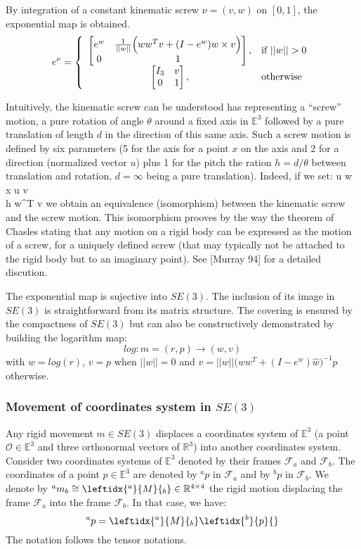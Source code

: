 \documentclass{book}
\begin{document}
By integration of a constant kinematic screw $\nu = (v,w)$ on $[0,1]$, the exponential map is obtained.
\[ e^{\nu} =
\left\{ \begin{array}{cl}
 \BIN e^{w} &  \frac{1}{||w||}\Big( ww^Tv + (I-e^{w}) w \times v \Big) \\ 0 & 1 \BOUT,& \textrm{if } ||w||>0 \\
 \BIN I_3 &  v \\ 0 & 1 \BOUT,& \textrm{otherwise}
\end{array}\right.
\] 

Intuitively, the kinematic screw can be understood has representing a ``screw'' motion, \mie a pure rotation of angle $\theta$ around a fixed axis in $\mathbb{E}^3$ followed by a pure translation of length $d$ in the direction of this same axis. Such a screw motion is defined by six parameters (5 for the axis  for a point $x$ on the axis and 2 for a  direction (normalized vector $u$) plus 1 for the pitch \mie the ration $h=d/\theta$ between translation and rotation, $d=\infty$ being a pure translation). Indeed, if we set:
\EAIN u \triangleq {} w  \\ x \triangleq u \times v \\ h \triangleq w^T v \EAOUT
we obtain an equivalence (isomorphism) between the kinematic screw and the screw motion. This isomorphism prooves by the way the theorem of Chasles stating that any motion on a rigid body can be expressed as the motion of a screw, for a uniquely defined screw (that may typically not be attached to the rigid body but to an imaginary point).
See [Murray 94] for a detailed discution.

The exponential map is sujective into $SE(3)$. The inclusion of its image in $SE(3)$ is straightforward from its matrix structure. The covering is ensured by the compactness of $SE(3)$ but can also be constructively demonstrated by building the logarithm map:
\[ log: m = (r,p) \rightarrow (w, v) \]
with $w=log(r)$, $v = p$ when $||w||=0$ and $v = ||w|| \Big( ww^T + (I-e^w)\hat{w} \Big)^{-1} p$ otherwise.

\subsubsection{Movement of coordinates system in $SE(3)$}

Any rigid movement $m \in SE(3)$ displaces a coordinates system of $\mathbb{E}^3$ (\mie a point $\mathcal{O} \in \mathbb{E}^3$ and three orthonormal vectors of $\mathbb{R}^3$) into another coordinates system. Consider two coordinates systems of $\mathbb{E}^3$ denoted by their frames $\mathcal{F}_a$ and  $\mathcal{F}_b$. The coordinates of a point $p\in \mathbb{E}^3$ are denoted by $^ap$ in $\mathcal{F}_a$ and by $^bp$ in $\mathcal{F}_b$. We denote by $^am_b \repr \leftidx{^a}{M}{_b} \in \mathbb{R}^{4\times4}$ the rigid motion displacing the frame $\mathcal{F}_a$ into the frame  $\mathcal{F}_b$. In that case, we have:
\[ ^ap = \leftidx{^a}{M}{_b} \leftidx{^b}{p}{} \]
The notation follows the tensor notations. 
\end{document}
